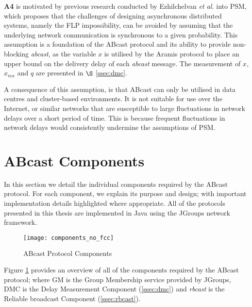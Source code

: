 \begin{description}
        \textbf{A4} is motivated by previous research conducted by Ezhilchelvan \emph{et al.} \citep{Ezhilchelvan:2010:LPR:1773912.1773927} into PSM, which proposes that the challenges of designing asynchronous distributed systems, namely the FLP impossibility, can be avoided by assuming that the underlying network communication is synchronous to a given probability.  This assumption is a foundation of the \textsf{ABcast} protocol and its ability to provide non-blocking \emph{abcast}, as the variable $x$ is utilised by the \textsf{Aramis} protocol to place an upper bound on the delivery delay of each \emph{abcast} message.  The measurement of $x$, $x_{mx}$ and $q$ are presented in $\S$ \ref{ssec:dmc}.   
        
        A consequence of this assumption, is that \textsf{ABcast} can only be utilised in data centres and cluster-based environments.  It is not suitable for use over the Internet, or similar networks that are susceptible to large fluctuations in network delays over a short period of time.  This is because frequent fluctuations in network delays would consistently undermine the assumptions of PSM.  
    \end{description}
    
\section{ABcast Components}
In this section we detail the individual components required by the \textsf{ABcast} protocol.  For each component, we explain its purpose and design; with important implementation details highlighted where appropriate.  All of the protocols presented in this thesis are implemented in Java using the JGroups \citep{JGroups} network framework.  

    \begin{figure}[!h] 
        \centering    
         \texttt{[image: components\_no\_fcc]}
         \caption[\textsf{ABcast} Protocol Components Overview]{\textsf{ABcast} Protocol Components}
         \label{fig:abcast_components}
    \end{figure}
    
   Figure \ref{fig:abcast_components} provides an overview of all of the components required by the \textsf{ABcast} protocol; where GM is the Group Membership service provided by JGroups, DMC is the Delay Measurement Component (\ref{ssec:dmc}) and \emph{rbcast} is the Reliable broadcast Component (\ref{ssec:rbcast}).  

